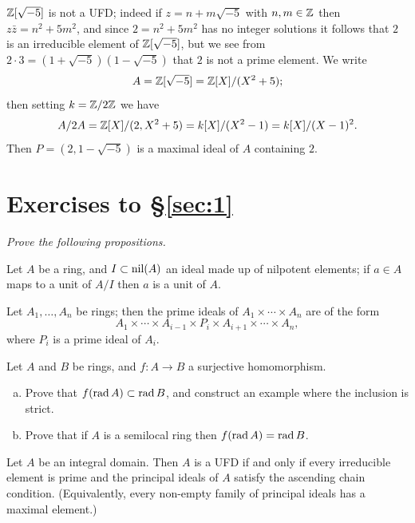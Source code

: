 \begin{example}
$\mathbb{Z}[\sqrt{-5}]$ is not a UFD; indeed if $z = n + m\sqrt{-5}$ with $n, m \in \mathbb{Z}$ then
$z\bar{z} = n^2 + 5m^2$, and since $2 = n^2 + 5m^2$ has no integer solutions it
follows that $2$ is an irreducible element of $\mathbb{Z}[\sqrt{-5}]$, but we see from
$2 \cdot 3 = (1 + \sqrt{-5})(1 - \sqrt{-5})$ that $2$ is not a prime element. We write
\[
  A = \mathbb{Z}[\sqrt{-5}] = \mathbb{Z}[X]/(X^2 + 5);
\]
then setting $k = \mathbb{Z}/2\mathbb{Z}$ we have
\[
  A/2A = \mathbb{Z}[X]/(2, X^2 + 5) = k[X]/(X^2 - 1) = k[X]/(X - 1)^2.
\]
Then $P = (2, 1 - \sqrt{-5})$ is a maximal ideal of $A$ containing $2$.
\end{example}

\section*{Exercises to \S\ref{sec:1}}
\emph{Prove the following propositions.}

\begin{exercise}\label{ex:1.1-ex}
Let $A$ be a ring, and $I \subset \operatorname{nil}(A)$ an ideal made up of nilpotent elements;
if $a \in A$ maps to a unit of $A/I$ then $a$ is a unit of $A$.
\end{exercise}

\begin{exercise}\label{ex:1.2-ex}
Let $A_1, \ldots, A_n$ be rings; then the prime ideals of $A_1 \times \cdots \times A_n$ are of the form
\[
  A_1 \times \cdots \times A_{i-1} \times P_i \times A_{i+1} \times \cdots \times A_n,
\]
where $P_i$ is a prime ideal of $A_i$.
\end{exercise}

\begin{exercise}\label{ex:1.3-ex}
Let $A$ and $B$ be rings, and $f\colon A \to B$ a surjective homomorphism.
\begin{enumerate}[(a)]
  \item Prove that $f(\operatorname{rad} A) \subset \operatorname{rad} B$, and construct an example where the
        inclusion is strict.
  \item Prove that if $A$ is a semilocal ring then $f(\operatorname{rad} A) = \operatorname{rad} B$.
\end{enumerate}
\end{exercise}

\begin{exercise}\label{ex:1.4-ex}
Let $A$ be an integral domain. Then $A$ is a UFD if and only if every
irreducible element is prime and the principal ideals of $A$ satisfy the
ascending chain condition. (Equivalently, every non-empty family of
principal ideals has a maximal element.)
\end{exercise}

